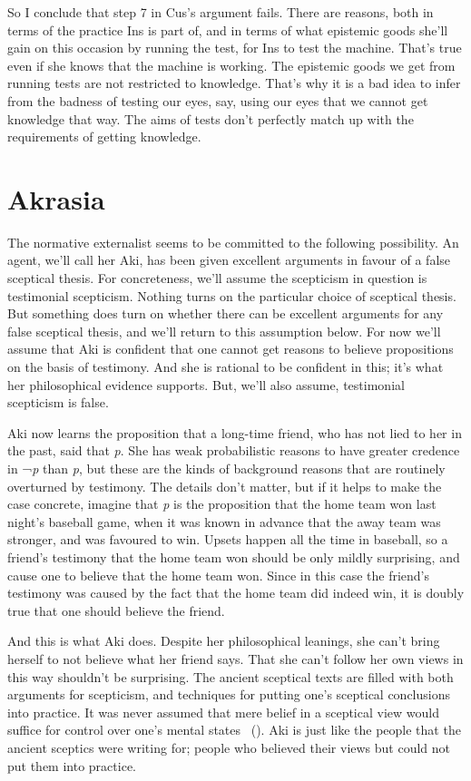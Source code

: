 \documentclass[
  10pt,
  letterpaper,
  twoside]{scrbook}
\begin{document}
So I conclude that step 7 in {Cus}'s argument fails. There are reasons,
both in terms of the practice {Ins} is part of, and in terms of what
epistemic goods she'll gain on this occasion by running the test, for
{Ins} to test the machine. That's true even if she knows that the
machine is working. The epistemic goods we get from running tests are
not restricted to knowledge. That's why it is a bad idea to infer from
the badness of testing our eyes, say, using our eyes that we cannot get
knowledge that way. The aims of tests don't perfectly match up with the
requirements of getting knowledge.

\chapter{Akrasia}\label{akrasia-1}

The normative externalist seems to be committed to the following
possibility. An agent, we'll call her {Aki}, has been given excellent
arguments in favour of a false sceptical thesis. For concreteness, we'll
assume the scepticism in question is testimonial scepticism. Nothing
turns on the particular choice of sceptical thesis. But something does
turn on whether there can be excellent arguments for any false sceptical
thesis, and we'll return to this assumption below. For now we'll assume
that {Aki} is confident that one cannot get reasons to believe
propositions on the basis of testimony. And she is rational to be
confident in this; it's what her philosophical evidence supports. But,
we'll also assume, testimonial scepticism is false.

{Aki} now learns the proposition that a long-time friend, who has not
lied to her in the past, said that \emph{p}. She has weak probabilistic
reasons to have greater credence in ¬\emph{p} than \emph{p}, but these
are the kinds of background reasons that are routinely overturned by
testimony. The details don't matter, but if it helps to make the case
concrete, imagine that \emph{p} is the proposition that the home team
won last night's baseball game, when it was known in advance that the
away team was stronger, and was favoured to win. Upsets happen all the
time in baseball, so a friend's testimony that the home team won should
be only mildly surprising, and cause one to believe that the home team
won. Since in this case the friend's testimony was caused by the fact
that the home team did indeed win, it is doubly true that one should
believe the friend.

And this is what {Aki} does. Despite her philosophical leanings, she
can't bring herself to not believe what her friend says. That she can't
follow her own views in this way shouldn't be surprising. The ancient
sceptical texts are filled with both arguments for scepticism, and
techniques for putting one's sceptical conclusions into practice. It was
never assumed that mere belief in a sceptical view would suffice for
control over one's mental states ~(). {Aki} is just like the people that the ancient sceptics were
writing for; people who believed their views but could not put them into
practice.
\end{document}
